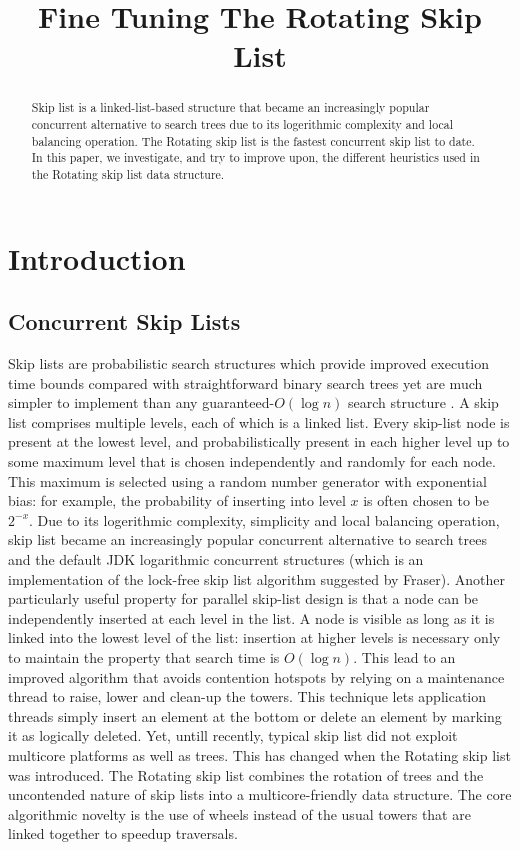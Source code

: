 \documentclass{article}
\title{Fine Tuning The Rotating Skip List}
\begin{document}
%
\maketitle
%
\begin{abstract}
Skip list \cite{C3} is a linked-list-based structure that became an increasingly popular concurrent alternative to search trees due to its logerithmic complexity and local balancing operation. The Rotating skip list \cite{C1} is the fastest concurrent skip list to date. In this paper, we investigate, and try to improve upon, the different heuristics used in the Rotating skip list data structure.
\end{abstract}
%
\section{Introduction}
\label{sec:intro}

\subsection{Concurrent Skip Lists}
\label{ssec:csl}
Skip lists are probabilistic search structures which provide improved execution time bounds compared with straightforward binary search trees yet are much simpler to implement than any guaranteed-$O(\log{n})$ search structure \cite{C3}.
A skip list comprises multiple levels, each of which is a linked list. Every skip-list node is present at the lowest level, and probabilistically present in each higher level up to some maximum level that is chosen independently and randomly for each node. This maximum is selected using a random number generator with
exponential bias: for example, the probability of inserting into level $x$ is often chosen to be $2^{-x}$.
Due to its logerithmic complexity, simplicity and local balancing operation, skip list became an increasingly popular concurrent alternative to search trees and  the default JDK logarithmic concurrent structures (which is an implementation of the lock-free skip list algorithm suggested by Fraser\cite{C4}). Another particularly useful property for parallel skip-list design is that a node can be independently inserted at each level in the list. A node is visible as long as it is linked into the lowest level of the list: insertion at higher levels is necessary only to maintain the property that search time is $O(\log{n})$. This lead to an improved algorithm \cite{C2} that avoids contention hotspots by relying on a maintenance thread to raise, lower and clean-up the towers. This technique lets application threads simply insert an element at the bottom or delete an element by marking it as logically deleted. Yet, untill recently, typical skip list did not exploit multicore platforms as well as trees. This has changed when the Rotating skip list was introduced. The Rotating skip list \cite{C1} combines the rotation of trees and the uncontended nature of skip lists into a multicore-friendly data structure. The core algorithmic novelty is the use of wheels instead of the usual towers that are linked together to speedup traversals.
\end{document}
